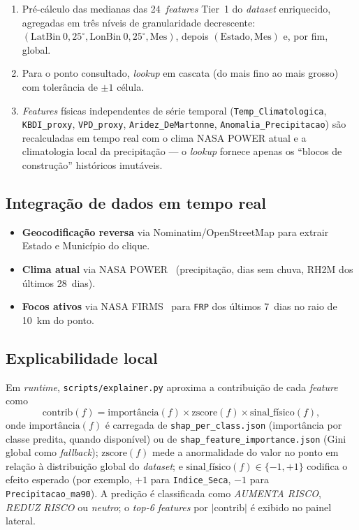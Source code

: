 \begin{enumerate}
  \item Pré-cálculo das medianas das 24~\emph{features} Tier~1 do \emph{dataset} enriquecido, agregadas em três níveis de granularidade decrescente: \((\text{LatBin}~0{,}25^\circ, \text{LonBin}~0{,}25^\circ, \text{Mes})\), depois \((\text{Estado}, \text{Mes})\) e, por fim,  global.

  \item Para o ponto consultado, \emph{lookup} em cascata (do mais fino ao mais grosso) com tolerância de \(\pm 1\) célula.

  \item \emph{Features} físicas independentes de série temporal (\texttt{Temp\_Climatologica}, \texttt{KBDI\_proxy}, \texttt{VPD\_proxy}, \texttt{Aridez\_DeMartonne}, \texttt{Anomalia\_Precipitacao}) são recalculadas em tempo real com o clima NASA POWER atual e a climatologia local da precipitação --- o \emph{lookup} fornece apenas os ``blocos de construção'' históricos imutáveis.
\end{enumerate}

\subsection{Integração de dados em tempo real}

\begin{itemize}
  \item \textbf{Geocodificação reversa} via Nominatim/OpenStreetMap para extrair Estado e Município do clique.
  \item \textbf{Clima atual} via NASA POWER~\cite{nasapower} (precipitação, dias sem chuva, RH2M dos últimos 28~dias).
  \item \textbf{Focos ativos} via NASA FIRMS~\cite{nasafirms} para \texttt{FRP} dos últimos 7~dias no raio de \SI{10}{\km} do ponto.
\end{itemize}

\subsection{Explicabilidade local}

Em \emph{runtime}, \texttt{scripts/explainer.py} aproxima a contribuição de cada \emph{feature} como
\begin{equation}
\mathrm{contrib}(f) = \mathrm{importância}(f) \times \mathrm{zscore}(f) \times \mathrm{sinal\_físico}(f),
\end{equation}
onde \(\mathrm{importância}(f)\) é carregada de \texttt{shap\_per\_class.json} (importância por classe predita, quando disponível) ou de \texttt{shap\_feature\_importance.json} (Gini global como \emph{fallback}); \(\mathrm{zscore}(f)\) mede a anormalidade do valor no ponto em relação à distribuição global do \emph{dataset}; e \(\mathrm{sinal\_físico}(f) \in \{-1, +1\}\) codifica o efeito esperado (por exemplo, \(+1\) para \texttt{Indice\_Seca}, \(-1\) para \texttt{Precipitacao\_ma90}). A predição é classificada como \emph{AUMENTA RISCO}, \emph{REDUZ RISCO} ou \emph{neutro}; o \emph{top-6 features} por \(|\mathrm{contrib}|\) é exibido no painel lateral.

